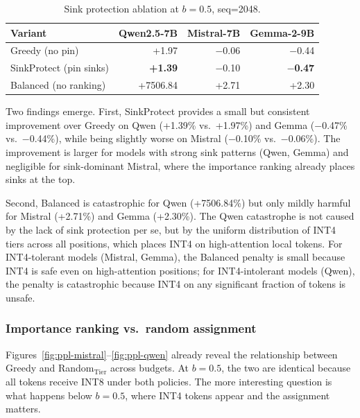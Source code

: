 \documentclass[11pt]{article}
\newcommand{\budget}{b}
\newcommand{\pct}{\%}
\theoremstyle{plain}
\theoremstyle{definition}
\begin{document}
\begin{table}[t]
\centering
\caption{Sink protection ablation at $\budget=0.5$, seq=2048.}
\label{tab:ablation-sink}
\small
\begin{tabular}{lrrr}
\toprule
Variant & Qwen2.5-7B & Mistral-7B & Gemma-2-9B \\
\midrule
Greedy (no pin) & +1.97 & $-$0.06 & $-$0.44 \\
SinkProtect (pin sinks) & \textbf{+1.39} & $-$0.10 & \textbf{$-$0.47} \\
Balanced (no ranking) & +7506.84 & +2.71 & +2.30 \\
\bottomrule
\end{tabular}
\end{table}

Two findings emerge.  First, SinkProtect provides a small but consistent improvement over Greedy on Qwen (+1.39\pct{} vs.\ +1.97\pct{}) and Gemma ($-$0.47\pct{} vs.\ $-$0.44\pct{}), while being slightly worse on Mistral ($-$0.10\pct{} vs.\ $-$0.06\pct{}).  The improvement is larger for models with strong sink patterns (Qwen, Gemma) and negligible for sink-dominant Mistral, where the importance ranking already places sinks at the top.

Second, Balanced is catastrophic for Qwen (+7506.84\pct{}) but only mildly harmful for Mistral (+2.71\pct{}) and Gemma (+2.30\pct{}).  The Qwen catastrophe is not caused by the lack of sink protection per se, but by the uniform distribution of INT4 tiers across all positions, which places INT4 on high-attention local tokens.  For INT4-tolerant models (Mistral, Gemma), the Balanced penalty is small because INT4 is safe even on high-attention positions; for INT4-intolerant models (Qwen), the penalty is catastrophic because INT4 on any significant fraction of tokens is unsafe.

\subsubsection{Importance ranking vs.\ random assignment}
\label{sec:ablation-ranking}

Figures~\ref{fig:ppl-mistral}--\ref{fig:ppl-qwen} already reveal the relationship between Greedy and Random$_{\text{Tier}}$ across budgets.  At $\budget=0.5$, the two are identical because all tokens receive INT8 under both policies.  The more interesting question is what happens below $\budget=0.5$, where INT4 tokens appear and the assignment matters.
\end{document}
